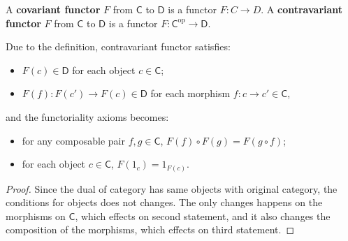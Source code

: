 \begin{defn} A \textbf{covariant functor} $F$ from $\mathsf{C}$ to $\mathsf{D}$ is a functor $F:C\rightarrow D$. A \textbf{contravariant functor} $F$ from $\mathsf{C}$ to $\mathsf{D}$ is a functor $F:\mathsf{C}^{\mathrm{op}}\rightarrow \mathsf{D}$.
\end{defn}

\begin{prop}
Due to the definition, contravariant functor satisfies:
\begin{itemize}
\item $F(c)\in \mathsf{D}$ for each object $c\in\mathsf{C}$;
\item $F(f):F(c')\rightarrow F(c)\in \mathsf{D}$ for each morphism $f:c\rightarrow c'\in\mathsf{C}$,
\end{itemize}
and the functoriality axioms becomes:
\begin{itemize}
\item for any composable pair $f,g\in\mathsf{C}$, $F(f)\circ F(g)=F(g\circ f)$;
\item for each object $c\in\mathsf{C}$, $F(1_c)=1_{F(c)}$.
\end{itemize}
\end{prop}
\begin{proof}
Since the dual of category has same objects with original category, the conditions for objects does not changes. The only changes happens on the morphisms on $\mathsf{C}$, which effects on second statement, and it also changes the composition of the morphisms, which effects on third statement.
\end{proof}

